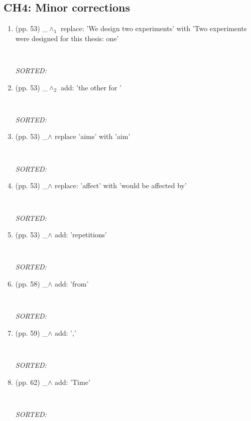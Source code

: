 \documentclass[12pt]{article}
\begin{document}
\subsection{CH4: Minor corrections}
\begin{enumerate}

\item  (pp. 53)  \_$\wedge_1$  
	replace: 'We design two experiments' with
	'Two experiments were designed for this thesis: one'
	\begin{verbatim}
	
	\end{verbatim}
	\textit{
	SORTED:  
	}
	\\

\item  (pp. 53)  \_$\wedge_2$  
	add: 'the other for '
	\begin{verbatim}
	
	\end{verbatim}
	\textit{
	SORTED:  
	}
	\\


\item  (pp. 53)  \_$\wedge$  
	replace 'aims'  with 'aim'
	\begin{verbatim}
	
	\end{verbatim}
	\textit{
	SORTED:  
	}
	\\

\item  (pp. 53)  \_$\wedge$  
	replace: 'affect' with
	'would be affected by'
	\begin{verbatim}
	
	\end{verbatim}
	\textit{
	SORTED:  
	}
	\\

\item  (pp. 53)  \_$\wedge$  
	add: 'repetitions'
	\begin{verbatim}
	
	\end{verbatim}
	\textit{
	SORTED:  
	}
	\\

\item  (pp. 58)  \_$\wedge$  
	add: 'from'
	\begin{verbatim}
	
	\end{verbatim}
	\textit{
	SORTED:  
	}
	\\

\item  (pp. 59)  \_$\wedge$  
	add: ','
	\begin{verbatim}
	
	\end{verbatim}
	\textit{
	SORTED:  
	}
	\\


\item  (pp. 62)  \_$\wedge$  
	add: 'Time'
	\begin{verbatim}
	
	\end{verbatim}
	\textit{
	SORTED:  
	}
	\\




\end{enumerate}
\end{document}
